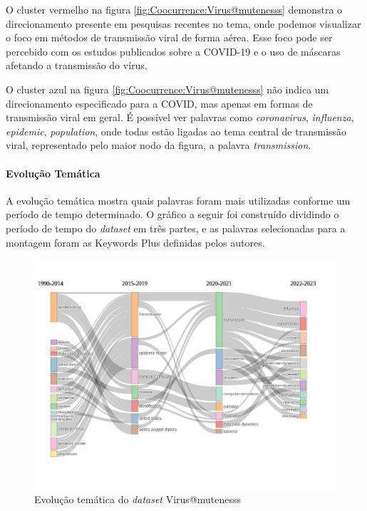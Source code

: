  O cluster vermelho na figura \ref{fig:Coocurrence:Virus@mutenesss} demonstra o direcionamento presente em pesquisas recentes no tema, onde podemos visualizar o foco em métodos de transmissão viral de forma aérea.
 Esse foco pode ser percebido com os estudos publicados sobre a COVID-19 e o uso de máscaras afetando a transmissão do vírus.
 
 O cluster azul na figura \ref{fig:Coocurrence:Virus@mutenesss} não indica um direcionamento especificado para a COVID, mas apenas em formas de transmissão viral em geral. É possível ver palavras como \textit{coronavirus}, \textit{influenza}, \textit{epidemic}, \textit{population}, onde todas estão ligadas ao tema central de transmissão viral, representado pelo maior nodo da figura, a palavra \textit{transmission}.

\paragraph{Evolução Temática}
 A evolução temática mostra quais palavras foram mais utilizadas conforme um período de tempo determinado. O gráfico a seguir foi construído dividindo o período de tempo do \textit{dataset} em três partes, e as palavras selecionadas para a montagem foram as Keywords Plus definidas pelos autores.

 \begin{figure}[h]
     \centering
     \includegraphics[width=1\textwidth]{exploratory-data-analysis/mutenesss/Virus/20221128/img/thematic_evo.png}
     \caption{Evolução temática do \textit{dataset} Virus@mutenesss}
     \label{fig:Thematic_Evo:Virus@mutenesss}
\end{figure}


